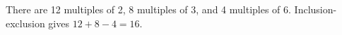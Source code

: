 There are 12 multiples of 2, 8 multiples of 3, and 4 multiples of 6. Inclusion-exclusion gives $12+8-4=\boxed{16}$.
